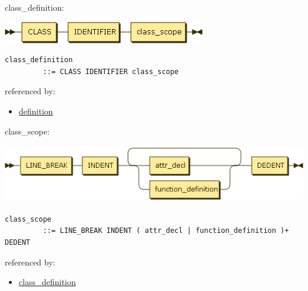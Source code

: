\begin{minipage}{\textwidth}
\protect\hypertarget{class_definition}{}{class\_definition:}

\includegraphics[width=3.47917in,height=0.37500in]{diagram/class_definition.png}

\begin{verbatim}
class_definition
         ::= CLASS IDENTIFIER class_scope
\end{verbatim}

referenced by:

\begin{itemize}
\tightlist
\item
  \protect\hyperlink{definition}{definition}
\end{itemize}

\end{minipage}

\begin{minipage}{\textwidth}
\protect\hypertarget{class_scope}{}{class\_scope:}

\includegraphics[width=5.72917in,height=1.00000in]{diagram/class_scope.png}

\begin{verbatim}
class_scope
         ::= LINE_BREAK INDENT ( attr_decl | function_definition )+ DEDENT
\end{verbatim}

referenced by:

\begin{itemize}
\tightlist
\item
  \protect\hyperlink{class_definition}{class\_definition}
\end{itemize}

\end{minipage}

